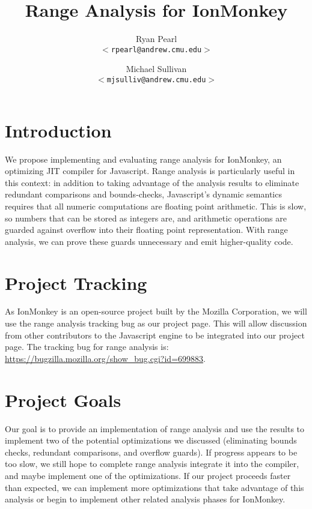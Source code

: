 \documentclass{article}
\begin{document}
\title{\bf Range Analysis for IonMonkey}

\author{
Ryan Pearl\\
\texttt{$<$rpearl@andrew.cmu.edu$>$}\\
\and
Michael Sullivan\\
\texttt{$<$mjsulliv@andrew.cmu.edu$>$}\\
}

\maketitle

\section{Introduction}
We propose implementing and evaluating range analysis for IonMonkey,
an optimizing JIT compiler for Javascript. Range analysis is
particularly useful in this context: in addition to taking advantage
of the analysis results to eliminate redundant comparisons and
bounds-checks, Javascript's dynamic semantics requires that all
numeric computations are floating point arithmetic.  This is slow, so
numbers that can be stored as integers are, and arithmetic operations
are guarded against overflow into their floating point
representation. With range analysis, we can prove these guards
unnecessary and emit higher-quality code.
\section{Project Tracking}
As IonMonkey is an open-source project built by the Mozilla
Corporation, we will use the range analysis tracking bug as our
project page. This will allow discussion from other contributors to
the Javascript engine to be integrated into our project page. The
tracking bug for range analysis is:
\\ \url{https://bugzilla.mozilla.org/show_bug.cgi?id=699883}.

\section{Project Goals}
Our goal is to provide an implementation of range analysis and use the
results to implement two of the potential optimizations we discussed
(eliminating bounds checks, redundant comparisons, and overflow
guards). If progress appears to be too slow, we still hope to complete
range analysis integrate it into the compiler, and maybe implement one
of the optimizations. If our project proceeds faster than expected, we
can implement more optimizations that take advantage of this analysis
or begin to implement other related analysis phases for IonMonkey.
\end{document}
